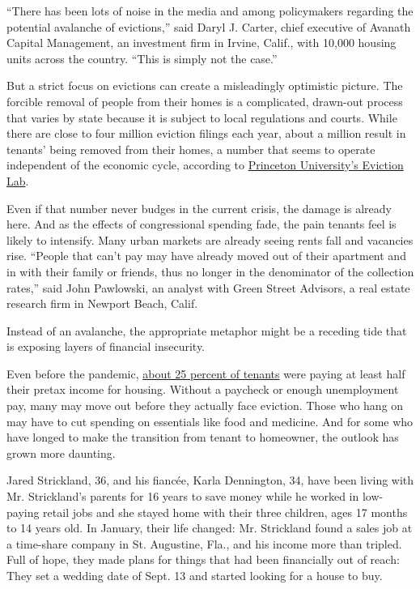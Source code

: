 ``There has been lots of noise in the media and among policymakers
regarding the potential avalanche of evictions,'' said Daryl J. Carter,
chief executive of Avanath Capital Management, an investment firm in
Irvine, Calif., with 10,000 housing units across the country. ``This is
simply not the case.''

But a strict focus on evictions can create a misleadingly optimistic
picture. The forcible removal of people from their homes is a
complicated, drawn-out process that varies by state because it is
subject to local regulations and courts. While there are close to four
million eviction filings each year, about a million result in tenants'
being removed from their homes, a number that seems to operate
independent of the economic cycle, according to
\href{https://evictionlab.org/}{Princeton University's Eviction Lab}.

Even if that number never budges in the current crisis, the damage is
already here. And as the effects of congressional spending fade, the
pain tenants feel is likely to intensify. Many urban markets are already
seeing rents fall and vacancies rise. ``People that can't pay may have
already moved out of their apartment and in with their family or
friends, thus no longer in the denominator of the collection rates,''
said John Pawlowski, an analyst with Green Street Advisors, a real
estate research firm in Newport Beach, Calif.

Instead of an avalanche, the appropriate metaphor might be a receding
tide that is exposing layers of financial insecurity.

Even before the pandemic,
\href{https://www.jchs.harvard.edu/sites/default/files/Harvard_JCHS_Americas_Rental_Housing_2020.pdf}{about
25 percent of tenants} were paying at least half their pretax income for
housing. Without a paycheck or enough unemployment pay, many may move
out before they actually face eviction. Those who hang on may have to
cut spending on essentials like food and medicine. And for some who have
longed to make the transition from tenant to homeowner, the outlook has
grown more daunting.

Jared Strickland, 36, and his fiancée, Karla Dennington, 34, have been
living with Mr. Strickland's parents for 16 years to save money while he
worked in low-paying retail jobs and she stayed home with their three
children, ages 17 months to 14 years old. In January, their life
changed: Mr. Strickland found a sales job at a time-share company in St.
Augustine, Fla., and his income more than tripled. Full of hope, they
made plans for things that had been financially out of reach: They set a
wedding date of Sept. 13 and started looking for a house to buy.

